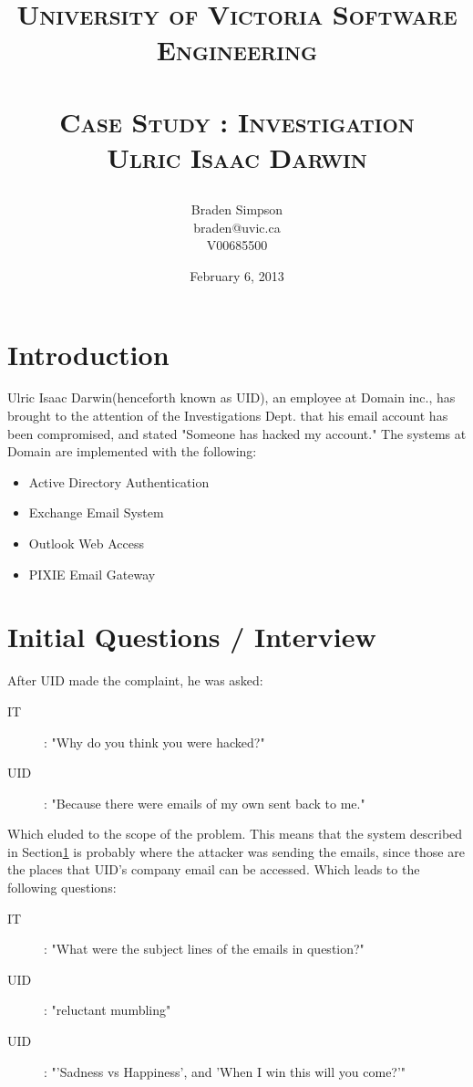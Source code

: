\documentclass{article}
\title{
\large{\textsc{University of Victoria Software Engineering}}\huge\\ [0pt] %
\horrule{0.5pt}\\[0.4cm]
\textsc{Case Study : Investigation \\Ulric Isaac Darwin}\\
\author{Braden Simpson\\braden@uvic.ca\\V00685500}
\date{February 6, 2013}
}
\numberwithin{equation}{section} %
\numberwithin{figure}{section} %
\numberwithin{table}{section} %
\begin{document}
\maketitle %


\section{Introduction}
\label{sec:intro}
Ulric Isaac Darwin(henceforth known as UID), an employee at Domain inc., has brought to the attention of the Investigations Dept. that his email account has been compromised, and stated "Someone has hacked my account."\cite{interview}  The systems at Domain are implemented with the following: 
\begin{itemize}
	\item Active Directory Authentication
	\item Exchange Email System
	\item Outlook Web Access
	\item PIXIE Email Gateway
\end{itemize}

\section{Initial Questions / Interview}
After UID made the complaint, he was asked:
\begin{description}
	\item [IT] : "Why do you think you were hacked?"
	\item [UID] : "Because there were emails of my own sent back to me."
\end{description}
Which eluded to the scope of the problem.  This means that the system described in Section\ref{sec:intro} is probably where the attacker was sending the emails, since those are the places that UID's company email can be accessed.  Which leads to the following questions: 
\begin{description}
	\item [IT] : "What were the subject lines of the emails in question?"
	\item [UID] : "reluctant mumbling"
	\item [UID] : "'Sadness vs Happiness', and 'When I win this will you come?'"
\end{description}
\end{document}
